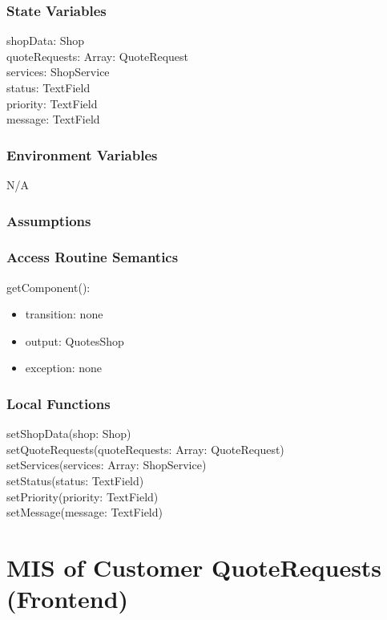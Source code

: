 \documentclass[12pt, titlepage]{article}
\begin{document}
\subsubsection{State Variables}

shopData: Shop \\
quoteRequests: Array: QuoteRequest \\
services: ShopService \\
status: TextField \\
priority: TextField \\
message: TextField \\

\subsubsection{Environment Variables}

N/A

\subsubsection{Assumptions}

\subsubsection{Access Routine Semantics}

\noindent getComponent():
\begin{itemize}
\item transition: none
\item output: QuotesShop
\item exception:  none
\end{itemize}

\subsubsection{Local Functions}

setShopData(shop: Shop) \\
setQuoteRequests(quoteRequests: Array: QuoteRequest) \\
setServices(services: Array: ShopService) \\
setStatus(status: TextField) \\
setPriority(priority: TextField) \\
setMessage(message: TextField) \\

\newpage

\section{MIS of Customer QuoteRequests (Frontend)} \label{Module}
\end{document}

